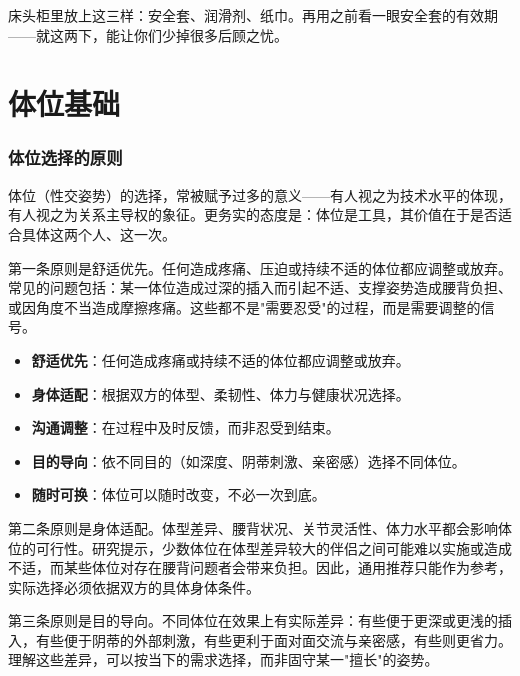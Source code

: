 \documentclass[12pt,UTF8]{ctexbook}
\newcommand{\keyword}[1]{\textbf{#1}}
\begin{document}
\begin{tcolorbox}[colback=pink!5!white,colframe=red!50!black,title=贴心小叮咛]
床头柜里放上这三样：安全套、润滑剂、纸巾。再用之前看一眼安全套的有效期——就这两下，能让你们少掉很多后顾之忧。
\end{tcolorbox}







\chapter{体位基础}

\subsection{体位选择的原则}

体位（性交姿势）的选择，常被赋予过多的意义——有人视之为技术水平的体现，有人视之为关系主导权的象征。更务实的态度是：体位是工具，其价值在于是否适合具体这两个人、这一次。

第一条原则是舒适优先。任何造成疼痛、压迫或持续不适的体位都应调整或放弃。常见的问题包括：某一体位造成过深的插入而引起不适、支撑姿势造成腰背负担、或因角度不当造成摩擦疼痛。这些都不是"需要忍受"的过程，而是需要调整的信号。

\begin{itemize}
	\item \keyword{舒适优先}：任何造成疼痛或持续不适的体位都应调整或放弃。
	\item \keyword{身体适配}：根据双方的体型、柔韧性、体力与健康状况选择。
	\item \keyword{沟通调整}：在过程中及时反馈，而非忍受到结束。
	\item \keyword{目的导向}：依不同目的（如深度、阴蒂刺激、亲密感）选择不同体位。
	\item \keyword{随时可换}：体位可以随时改变，不必一次到底。
\end{itemize}

第二条原则是身体适配。体型差异、腰背状况、关节灵活性、体力水平都会影响体位的可行性。研究提示，少数体位在体型差异较大的伴侣之间可能难以实施或造成不适，而某些体位对存在腰背问题者会带来负担。因此，通用推荐只能作为参考，实际选择必须依据双方的具体身体条件。

第三条原则是目的导向。不同体位在效果上有实际差异：有些便于更深或更浅的插入，有些便于阴蒂的外部刺激，有些更利于面对面交流与亲密感，有些则更省力。理解这些差异，可以按当下的需求选择，而非固守某一"擅长"的姿势。
\end{document}
